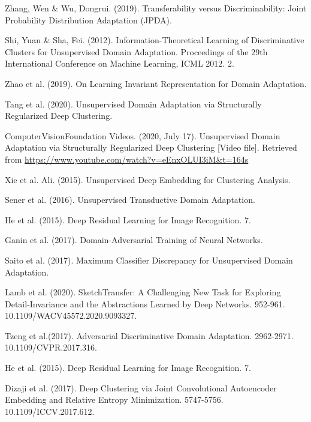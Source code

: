 \documentclass[runningheads]{llncs}
\begin{document}
%
%
%
% 
% 
%


\begin{thebibliography}{8}


Zhang, Wen \& Wu, Dongrui. (2019). Transferability versus Discriminability: Joint Probability Distribution Adaptation (JPDA). 

Shi, Yuan \& Sha, Fei. (2012). Information-Theoretical Learning of Discriminative Clusters for
Unsupervised Domain Adaptation. Proceedings of the 29th International Conference on Machine Learning, ICML 2012. 2. 

Zhao et al. (2019). On Learning Invariant Representation for Domain Adaptation. 

Tang et al. (2020). Unsupervised Domain Adaptation via Structurally Regularized Deep Clustering. 

ComputerVisionFoundation Videos. (2020, July 17). Unsupervised Domain Adaptation via Structurally Regularized Deep Clustering [Video file]. Retrieved from
\url{https://www.youtube.com/watch?v=eEnxOLUI3iM\&t=164s}

Xie et al. Ali. (2015). Unsupervised Deep Embedding for Clustering Analysis.

Sener et al. (2016). Unsupervised Transductive Domain Adaptation. 

He et al. (2015). Deep Residual Learning for Image Recognition. 7. 

Ganin et al. (2017). Domain-Adversarial Training of Neural Networks.

Saito et al. (2017). Maximum Classifier Discrepancy for Unsupervised Domain Adaptation.

Lamb et al. (2020). SketchTransfer: A Challenging New Task for Exploring Detail-Invariance and the Abstractions Learned by Deep Networks. 952-961. 10.1109/WACV45572.2020.9093327. 

Tzeng et al.(2017). Adversarial Discriminative Domain Adaptation. 2962-2971. 10.1109/CVPR.2017.316.

He et al. (2015). Deep Residual Learning for Image Recognition. 7.

Dizaji et al. (2017). Deep Clustering via Joint Convolutional Autoencoder Embedding and Relative Entropy Minimization. 5747-5756. 10.1109/ICCV.2017.612. 


\end{thebibliography}
\end{document}
